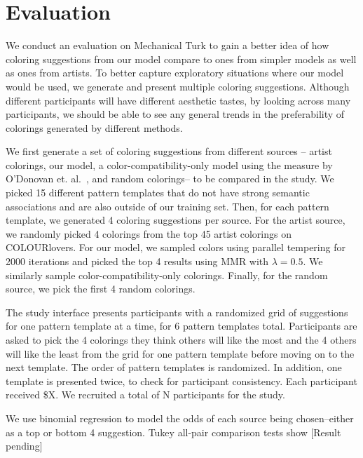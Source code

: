 \section{Evaluation}
\label{sec:evaluation}


We conduct an evaluation on Mechanical Turk to gain a better idea of how coloring suggestions from our model compare to ones from simpler models as well as ones from artists. To better capture exploratory situations where our model would be used, we generate and present multiple coloring suggestions. Although different participants will have different aesthetic tastes, by looking across many participants, we should be able to see any general trends in the preferability of colorings generated by different methods. 

We first generate a set of coloring suggestions from different sources -- artist colorings, our model, a color-compatibility-only model using the measure by O'Donovan et. al.~, and random colorings-- to be compared in the study. We picked 15 different pattern templates that do not have strong semantic associations and are also outside of our training set. Then, for each pattern template, we generated 4 coloring suggestions per source. For the artist source, we randomly picked 4 colorings from the top 45 artist colorings on COLOURlovers. For our model, we sampled colors using parallel tempering for 2000 iterations and picked the top 4 results using MMR with $\lambda = 0.5$. We similarly sample color-compatibility-only colorings. Finally, for the random source, we pick the first 4 random colorings.

The study interface presents participants with a randomized grid of suggestions for one pattern template at a time, for 6 pattern templates total. Participants are asked to pick the 4 colorings they think others will like the most and the 4 others will like the least from the grid for one pattern template before moving on to the next template. The order of pattern templates is randomized. In addition, one template is presented twice, to check for participant consistency. Each participant received \$X. We recruited a total of N participants for the study.



We use binomial regression to model the odds of each source being chosen--either as a top or bottom 4 suggestion. Tukey all-pair comparison tests show [Result pending]